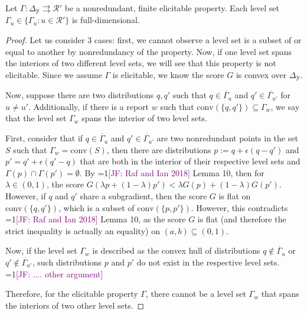 \documentclass[11pt]{colt2019}
\newcommand{\Comments}{1}
\newcommand{\mynote}[2]{\ifnum\Comments=1\textcolor{#1}{#2}\fi}
\newcommand{\jessie}[1]{\mynote{purple}{[JF: #1]}}
\newcommand{\simplex}{\Delta_\Y}
\newcommand{\R}{\mathcal{R}}
\newcommand{\Y}{\mathcal{Y}}
\newcommand{\inter}[1]{\mathring{#1}}%
\newcommand{\toto}{\rightrightarrows}
\newcommand{\conv}{\mathrm{conv}}
\begin{document}
\begin{lemma}\label{lem:finite-nonred-fdls}
Let $\Gamma:\simplex \toto \R'$ be a nonredundant, finite elicitable property.
Each level set $\Gamma_u \in \{\Gamma_u : u \in \R' \}$ is full-dimensional.
\end{lemma}
\begin{proof}
Let us consider 3 cases: first, we cannot observe a level set is a subset of or equal to another by nonredundancy of the property.
Now, if one level set spans the interiors of two different level sets, we will see that this property is not elicitable.
Since we assume $\Gamma$ is elicitable, we know the score $G$ is convex over $\simplex$.

Now, suppose there are two distributions $q,q'$ such that $q \in \inter{\Gamma_u}$ and $q' \in \inter{\Gamma_{u'}}$ for $u \neq u'$. 
Additionally, if there is a report $w$ such that $\conv(\{q,q'\}) \subseteq \Gamma_w$, we say that the level set $\Gamma_w$ spans the interior of two level sets.

First, consider that if $q \in \inter{\Gamma_u}$ and $q' \in \inter{\Gamma_{u'}}$ are two nonredundant points in the set $S$ such that $\Gamma_w = \conv(S)$, then there are distributions $p := q + \epsilon(q-q')$ and $p' = q' + \epsilon(q'-q)$ that are both in the interior of their respective level sets and $\Gamma(p) \cap \Gamma(p') = \emptyset$.
By \jessie{Raf and Ian 2018} Lemma 10, then for $\lambda \in (0,1)$, the score $G(\lambda p + (1-\lambda) p') < \lambda G(p) + (1-\lambda) G(p')$.
However, if $q$ and $q'$ share a subgradient, then the score $G$ is flat on $\conv(\{q,q'\})$, which is a subset of $\conv(\{p,p'\})$.
However, this contradicts \jessie{Raf and Ian 2018} Lemma 10, as the score $G$ is flat (and therefore the strict inequality is actually an equality) on $(a,b) \subseteq (0,1)$.

Now, if the level set $\Gamma_w$ is described as the convex hull of distributions $q \not \in \inter{\Gamma_u}$ or $q' \not \in \inter{\Gamma_{u'}}$, such distributions $p$ and $p'$ do not exist in the respective level sets.
\jessie{.... other argument} 

Therefore, for the elicitable property $\Gamma$, there cannot be a level set $\Gamma_w$ that spans the interiors of two other level sets.

\end{proof}
\end{document}
